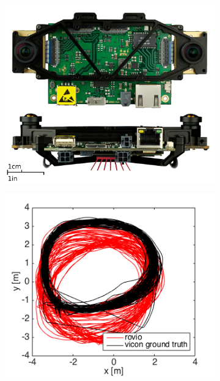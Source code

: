 \begin{figure}
  \begin{subfigure}[b]{0.3\textwidth}
    \includegraphics[width=\textwidth]{images/visensor.png}
    \caption{}
    \label{fig:1}
  \end{subfigure}
  \hfill
  \begin{subfigure}[b]{0.3\textwidth}
    \includegraphics[width=\textwidth]{images/ijrr/2D_rovio.png}
    \caption{}
    \label{fig:2}
  \end{subfigure}

\end{figure}
